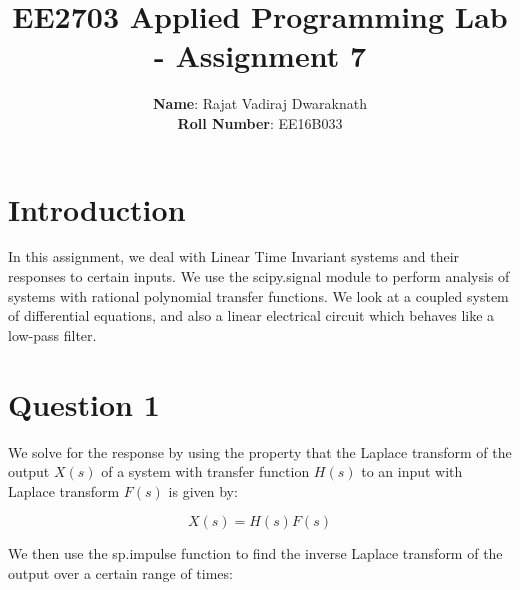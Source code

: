 \documentclass[11pt]{article}
\title{EE2703 Applied Programming Lab - Assignment 7}
\author{
  \textbf{Name}: Rajat Vadiraj Dwaraknath\\
  \textbf{Roll Number}: EE16B033
}
\begin{document}
    
    
    \maketitle
    
    

    
	

	
		
    \section{Introduction}\label{introduction}

In this assignment, we deal with Linear Time Invariant systems and their
responses to certain inputs. We use the scipy.signal module to perform
analysis of systems with rational polynomial transfer functions. We look
at a coupled system of differential equations, and also a linear
electrical circuit which behaves like a low-pass filter.

	

	

	

	

	
		
    \section{Question 1}\label{question-1}

We solve for the response by using the property that the Laplace
transform of the output \(X(s)\) of a system with transfer function
\(H(s)\) to an input with Laplace transform \(F(s)\) is given by:

\[X(s) = H(s) F(s)\]

We then use the sp.impulse function to find the inverse Laplace
transform of the output over a certain range of times:

	

	
		
	
	
		
	
		
			
		
	
		
			
		
	
		
			
		
	
		
			
		
	
		
			
		
	
		
			
\end{document}
